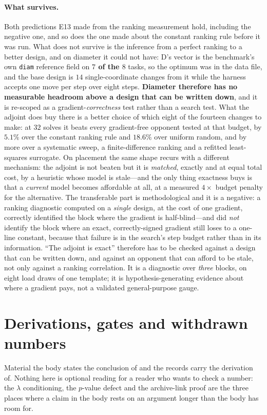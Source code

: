 \documentclass{article}
\begin{document}
\paragraph{What survives.}
Both predictions E13 made from the ranking measurement hold, including the negative one,
and so does the one made about the constant ranking rule before it was run.  What does not
survive is the inference from a perfect ranking to a better design, and on diameter it could
not have: D's vector is the benchmark's own \texttt{diam} reference field on
\textbf{$7$ of the $8$} tasks, so the optimum was in the data file, and the base design is
$14$ single-coordinate changes from it while the harness accepts one move per step over
eight steps.  \textbf{Diameter therefore has no measurable headroom above a design that
can be written down}, and it is re-scoped as a gradient-\emph{correctness} test rather
than a search test.  What the adjoint does buy there is a better choice of which eight of
the fourteen changes to make: at $32$ solves it beats every gradient-free opponent tested at
that budget, by $5.1\%$ over the constant ranking rule and $18.6\%$ over uniform random, and
by more over a systematic sweep, a finite-difference ranking and a refitted least-squares
surrogate.  On placement the same shape recurs with a different mechanism: the adjoint is not
beaten but it is \emph{matched}, exactly and at equal total cost, by a heuristic whose model
is stale---and the only thing exactness buys is that a \emph{current} model becomes
affordable at all, at a measured $4\times$ budget penalty for the alternative.  The
transferable part is methodological and it is a negative: a ranking diagnostic computed on a
\emph{single} design, at the cost of one gradient, correctly identified the block where the
gradient is half-blind---and did \emph{not} identify the block where an exact,
correctly-signed gradient still loses to a one-line constant, because that failure is in the
search's step budget rather than in its information.  ``The adjoint is exact'' therefore has
to be checked against a design that can be written down, and against an opponent that can
afford to be stale, not only against a ranking correlation.  It is a diagnostic over
\emph{three} blocks, on eight load draws of one template; it is hypothesis-generating
evidence about where a gradient pays, not a validated general-purpose gauge.

\section{Derivations, gates and withdrawn numbers}
\label{app:derivations}
Material the body states the conclusion of and the records carry the derivation of.  Nothing here is optional reading for a reader who wants to check a number: the $\lambda$ conditioning, the $p$-value defect and the archive-link proof are the three places where a claim in the body rests on an argument longer than the body has room for.
\end{document}
